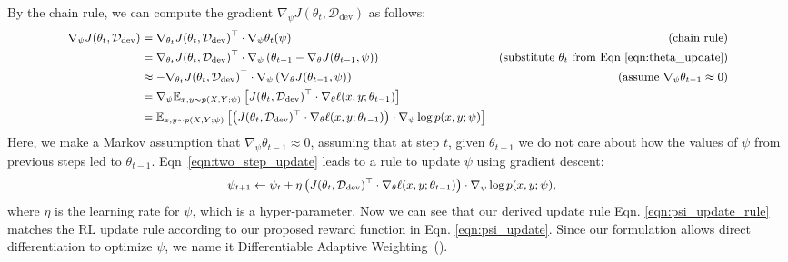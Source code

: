 By the chain rule, we can compute the gradient $\nabla_\psi J(\theta_t, \mathcal{D}_\text{dev})$ as follows:
\begin{equation}
  \label{eqn:two_step_update}
   \small
  \begin{aligned}
    \nabla_\psi J(\theta_t, \mathcal{D}_\text{dev})
      &= \nabla_{\theta_t} J(\theta_t, \mathcal{D}_\text{dev})^\top \cdot \nabla_\psi \theta_t(\psi) &\text{(chain rule)} \\
      &= \nabla_{\theta_t} J(\theta_t, \mathcal{D}_\text{dev})^\top \cdot \nabla_\psi \left( \theta_{t-1} - \nabla_\theta J(\theta_{t-1}, \psi) \right) &\text{(substitute $\theta_t$ from Eqn~\ref{eqn:theta_update})} \\
      &\approx -\nabla_{\theta_t} J(\theta_t, \mathcal{D}_\text{dev})^\top \cdot \nabla_\psi  \left( \nabla_\theta J(\theta_{t-1}, \psi) \right) &\text{(assume $\nabla_\psi \theta_{t-1} \approx 0$)} \\
      &= \nabla_\psi \mathbb{E}_{x, y \sim p(X, Y; \psi)} \left[J(\theta_t, \mathcal{D}_\text{dev})^\top \cdot \nabla_\theta \ell(x, y; \theta_{t-1} )\right] \\
    &= \mathbb{E}_{x, y \sim p(X, Y; \psi)} \left[\left( J(\theta_t, \mathcal{D}_\text{dev})^\top \cdot \nabla_\theta \ell(x, y; \theta_{t-1} ) \right) \cdot \nabla_\psi \log{p(x, y; \psi)} \right]
  \end{aligned}
\end{equation}
Here, we make a Markov assumption that $\nabla_\psi \theta_{t-1} \approx 0$, assuming that at step $t$, given $\theta_{t-1}$ we do not care about how the values of $\psi$ from previous steps led to $\theta_{t-1}$. Eqn~\ref{eqn:two_step_update} leads to a rule to update $\psi$ using gradient descent:
\begin{equation}
  \label{eqn:psi_update_rule}
   \small
  \begin{aligned}
    \psi_{t+1} 
      &\leftarrow \psi_t + \eta \left( J(\theta_t, \mathcal{D}_\text{dev})^\top \cdot \nabla_\theta \ell(x, y; \theta_{t-1} ) \right) \cdot \nabla_\psi \log{p(x, y; \psi)},
  \end{aligned}
\end{equation}
where $\eta$ is the learning rate for $\psi$, which is a hyper-parameter. Now we can see that our derived update rule Eqn. \ref{eqn:psi_update_rule} matches the RL update rule according to our proposed reward function in Eqn. \ref{eqn:psi_update}. Since our formulation allows direct differentiation to optimize $\psi$, we name it Differentiable Adaptive Weighting~(\dds).


